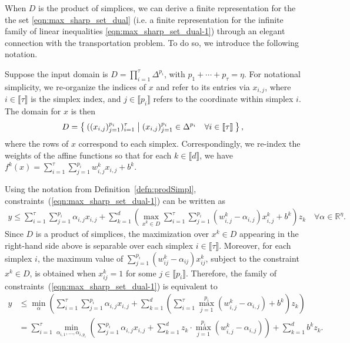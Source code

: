 \documentclass[smallextended]{svjour3}
\begin{document}
When $D$ is the product of simplices, we can derive a finite representation for the the set \eqref{eqn:max_sharp_set_dual} (i.e. a finite representation for the infinite family of linear inequalities \eqref{eqn:max_sharp_set_dual-1}) through an elegant connection with the transportation problem. To do so, we introduce the following notation.
\begin{definition} \label{defn:prodSimpl}
Suppose the input domain is $D = \prod_{i=1}^\tau \Delta^{p_i}$, with $p_1+\cdots+p_{\tau}=\eta$. For notational simplicity, we re-organize the indices of $x$ and refer to its entries via $x_{i,j}$, where $i\in\llbracket\tau\rrbracket$ is the simplex index, and $j\in\llbracket p_i\rrbracket$ refers to the coordinate within simplex $i$.
The domain for $x$ is then
\begin{align} \label{eqn:simplexDef}
D=\Set{ ((x_{i,j})_{j=1}^{p_i})_{i=1}^{\tau} | (x_{i,j})_{j=1}^{p_i} \in \Delta^{p_i} \quad \forall i \in \llbracket \tau \rrbracket },
\end{align}
where the rows of $x$ correspond to each simplex. Correspondingly, we re-index the weights of the affine functions so that for each $k\in\llbracket d\rrbracket$, we have
$f^k(x)=\sum_{i=1}^{\tau}\sum_{j=1}^{p_i}w^k_{i,j}x_{i,j}+b^k$.
\end{definition}

Using the notation from Definition~\ref{defn:prodSimpl}, constraints~(\ref{eqn:max_sharp_set_dual-1}) can be written as
\begin{align*}
y\leq\sum_{i=1}^{\tau}\sum_{j=1}^{p_i}\alpha_{i,j}x_{i,j} + \sum_{k=1}^d \left(\max_{x^k \in D}\sum_{i=1}^{\tau}\sum_{j=1}^{p_i}(w^k_{i,j} - \alpha_{i,j})x^k_{i,j} + b^k\right)z_k\quad\forall\alpha\in\mathbb{R}^{\eta}.
\end{align*}
Since $D$ is a product of simplices, the maximization over $x^k\in D$ appearing in the right-hand side above is separable over each simplex $i \in \llbracket \tau \rrbracket$. Moreover, for each simplex $i$, the maximum value of $\sum_{j=1}^{p_i}(w^k_{ij} - \alpha_{ij})x^k_{ij}$, subject to the constraint $x^k \in D$, is obtained when $x^k_{ij}=1$ for some $j\in\llbracket p_i\rrbracket$.
Therefore, the family of constraints~(\ref{eqn:max_sharp_set_dual-1}) is equivalent to
\begin{align}
y &\leq\min_{\alpha}\left(\sum_{i=1}^{\tau}\sum_{j=1}^{p_i}\alpha_{i,j}x_{i,j} + \sum_{k=1}^d \left(\sum_{i=1}^{\tau}\max_{j=1}^{p_i}(w^k_{i,j} - \alpha_{i,j}) + b^k\right)z_k\right) \nonumber \\
&=\sum_{i=1}^{\tau}\min_{\alpha_{i,1},\ldots,\alpha_{i,p_i}}\left(\sum_{j=1}^{p_i}\alpha_{i,j}x_{i,j} + \sum_{k=1}^dz_k\cdot\max_{j=1}^{p_i}(w^k_{i,j} - \alpha_{i,j})\right)+\sum_{k=1}^db^kz_k. \label{eqn:sharp_dual_prod_simpl}
\end{align}
\end{document}
